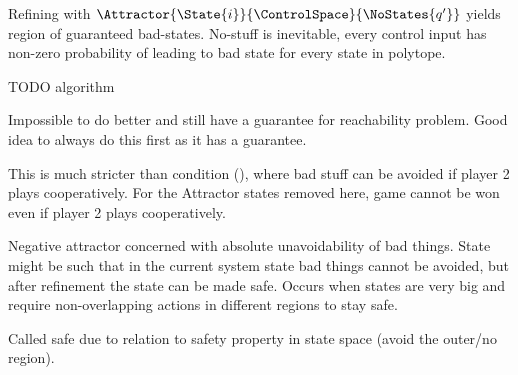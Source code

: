     Refining with $\Attractor{\State{i}}{\ControlSpace}{\NoStates{q'}}$ yields region of guaranteed bad-states.
    No-stuff is inevitable, every control input has non-zero probability of leading to bad state for every state in polytope.

    TODO algorithm

    Impossible to do better and still have a guarantee for reachability problem.
    Good idea to always do this first as it has a guarantee.

    This is much stricter than condition (), where bad stuff can be avoided if player 2 plays cooperatively.
    For the Attractor states removed here, game cannot be won even if player 2 plays cooperatively.

\stopsubsection


    \startalgorithmic[numbering=no,margin=0em]
    \stopalgorithmic
    \startalgorithmic
                    \ELSE
                    \ENDIF
                \ENDFOR
            \ENDIF
        \ENDFOR
    \stopalgorithmic
\stopbuffer

\startsubsection[title={Safety}]


    Negative attractor concerned with absolute unavoidability of bad things.
    State might be such that in the current system state bad things cannot be avoided, but after refinement the state can be made safe.
    Occurs when states are very big and require non-overlapping actions in different regions to stay safe.

    Called safe due to relation to safety property in state space (avoid the outer/no region).

